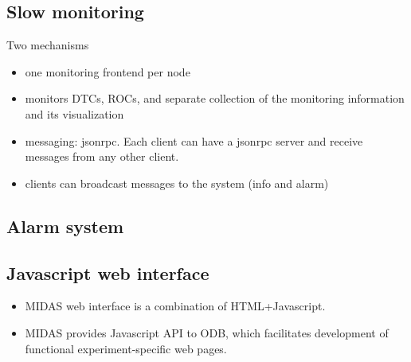 \subsection{Slow monitoring} 

Two mechanisms
\begin{itemize}
\item
  one monitoring frontend per node 
\item
  monitors DTCs, ROCs, and separate collection of the monitoring information and its visualization
\item
  messaging: jsonrpc. Each client can have a jsonrpc server and receive messages
  from any other client.
\item
  clients can broadcast messages to the system (info and alarm)
\end{itemize}

\subsection{Alarm system}


\subsection{Javascript web interface}

\begin{itemize}
\item 
  MIDAS web interface is a combination of HTML+Javascript.
\item 
  MIDAS provides Javascript API to ODB, which facilitates development of
  functional experiment-specific web pages.
\end{itemize}







